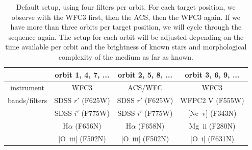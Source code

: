 \documentclass[12pt]{article}
\begin{document}

\begin{table}[htbp]
    \centering
    \begin{tabular}{c|ccc}
    \hline\hline
              & orbit 1, 4, 7, ... & orbit 2, 5, 8, ... & orbit 3, 6, 9, ... \\
              \hline
instrument    & WFC3 & ACS/WFC & WFC3 \\
\hline
bands/filters & SDSS $r'$ (F625W) & SDSS $r'$ (F625W) & 
               WFPC2 V (F555W)\\
              & SDSS $i'$ (F775W) & SDSS $i'$ (F775W) & 
              [Ne~{\sc v}] (F343N)\\
              & H$\alpha$ (F656N) & H$\alpha$ (F658N) & 
              Mg~{\sc ii} (F280N)\\
              & [O~{\sc iii}] (F502N) & [O~{\sc iii}]  (F502N) &
              [O~{\sc i}] (F631N)\\
        \hline
    \end{tabular}
    \caption{Default setup, using four filters per orbit. For each target position, we observe with the WFC3 first, then the ACS, then the WFC3 again. If we have more than three orbits per target position, we will cycle through the sequence again. The setup for each orbit will be adjusted depending on the time available per orbit and the brightness of known stars and morphological complexity of the medium as far as known.}
    \label{tab:setup}
\end{table}
\end{document}
